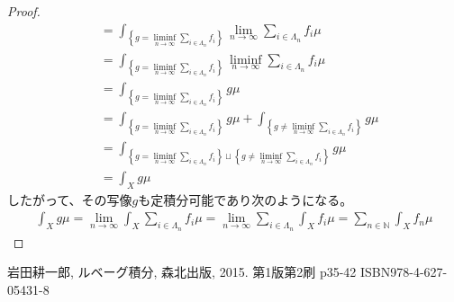 \documentclass[dvipdfmx]{jsarticle}
\begin{document}
\begin{proof}
\begin{align*}
&= \int_{\left\{ g = \liminf_{n \rightarrow \infty}{\sum_{i \in \varLambda_{n}} f_{i}} \right\}} {\lim_{n \rightarrow \infty}{\sum_{i \in \varLambda_{n}} f_{i}}\mu}\\
&= \int_{\left\{ g = \liminf_{n \rightarrow \infty}{\sum_{i \in \varLambda_{n}} f_{i}} \right\}} {\liminf_{n \rightarrow \infty}{\sum_{i \in \varLambda_{n}} f_{i}}\mu}\\
&= \int_{\left\{ g = \liminf_{n \rightarrow \infty}{\sum_{i \in \varLambda_{n}} f_{i}} \right\}} {g\mu}\\
&= \int_{\left\{ g = \liminf_{n \rightarrow \infty}{\sum_{i \in \varLambda_{n}} f_{i}} \right\}} {g\mu} + \int_{\left\{ g \neq \liminf_{n \rightarrow \infty}{\sum_{i \in \varLambda_{n}} f_{i}} \right\}} {g\mu}\\
&= \int_{\left\{ g = \liminf_{n \rightarrow \infty}{\sum_{i \in \varLambda_{n}} f_{i}} \right\} \sqcup \left\{ g \neq \liminf_{n \rightarrow \infty}{\sum_{i \in \varLambda_{n}} f_{i}} \right\}} {g\mu}\\
&= \int_{X} {g\mu}
\end{align*}
したがって、その写像$g$も定積分可能であり次のようになる。
\begin{align*}
\int_{X} {g\mu} = \lim_{n \rightarrow \infty}{\int_{X} {\sum_{i \in \varLambda_{n}} f_{i}\mu}} = \lim_{n \rightarrow \infty}{\sum_{i \in \varLambda_{n}} {\int_{X} {f_{i}\mu}}} = \sum_{n \in \mathbb{N}} {\int_{X} {f_{n}\mu}}
\end{align*}
\end{proof}
\begin{thebibliography}{50}
  岩田耕一郎, ルベーグ積分, 森北出版, 2015. 第1版第2刷 p35-42 ISBN978-4-627-05431-8
\end{thebibliography}
\end{document}
